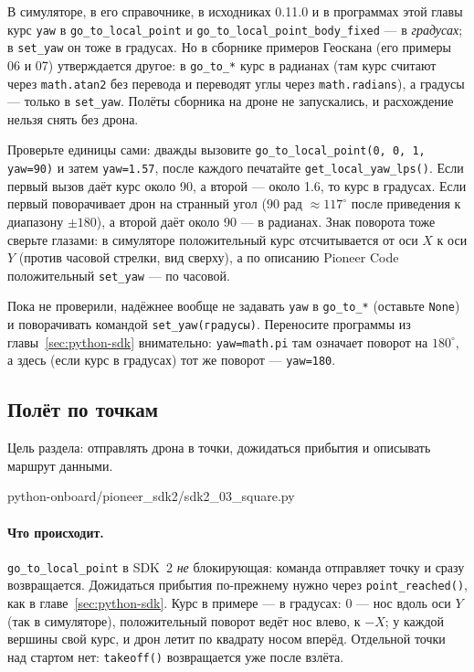 \begin{warnbox}
В симуляторе, в его справочнике, в исходниках 0.11.0 и в программах этой главы курс \verb|yaw| в \verb|go_to_local_point| и \verb|go_to_local_point_body_fixed| --- в \emph{градусах}; в \verb|set_yaw| он тоже в градусах. Но в сборнике примеров Геоскана (его примеры 06 и 07) утверждается другое: в \verb|go_to_*| курс в радианах (там курс считают через \verb|math.atan2| без перевода и переводят углы через \verb|math.radians|), а градусы --- только в \verb|set_yaw|. Полёты сборника на дроне не запускались, и расхождение нельзя снять без дрона.

Проверьте единицы сами: дважды вызовите \texttt{go\_to\_local\_point(0, 0, 1, yaw=90)} и затем \verb|yaw=1.57|, после каждого печатайте \verb|get_local_yaw_lps()|. Если первый вызов даёт курс около 90, а второй --- около 1.6, то курс в градусах. Если первый поворачивает дрон на странный угол ($90$ рад $\approx 117^\circ$ после приведения к диапазону $\pm180$), а второй даёт около 90 --- в радианах. Знак поворота тоже сверьте глазами: в симуляторе положительный курс отсчитывается от оси $X$ к оси $Y$ (против часовой стрелки, вид сверху), а по описанию Pioneer Code положительный \verb|set_yaw| --- по часовой.

Пока не проверили, надёжнее вообще не задавать \verb|yaw| в \verb|go_to_*| (оставьте \verb|None|) и поворачивать командой \verb|set_yaw(градусы)|. Переносите программы из главы~\ref{sec:python-sdk} внимательно: \verb|yaw=math.pi| там означает поворот на $180^\circ$, а здесь (если курс в градусах) тот же поворот --- \verb|yaw=180|.
\end{warnbox}

\subsection{Полёт по точкам}

Цель раздела: отправлять дрона в точки, дожидаться прибытия и описывать маршрут данными.

\begin{codefile}[python]{python-onboard/pioneer_sdk2/sdk2_03_square.py}
\end{codefile}

\paragraph{Что происходит.} \verb|go_to_local_point| в SDK~2 \emph{не} блокирующая: команда отправляет точку и сразу возвращается. Дожидаться прибытия по-прежнему нужно через \verb|point_reached()|, как в главе~\ref{sec:python-sdk}. Курс в примере --- в градусах: 0 --- нос вдоль оси $Y$ (так в симуляторе), положительный поворот ведёт нос влево, к $-X$; у каждой вершины свой курс, и дрон летит по квадрату носом вперёд. Отдельной точки над стартом нет: \verb|takeoff()| возвращается уже после взлёта.

